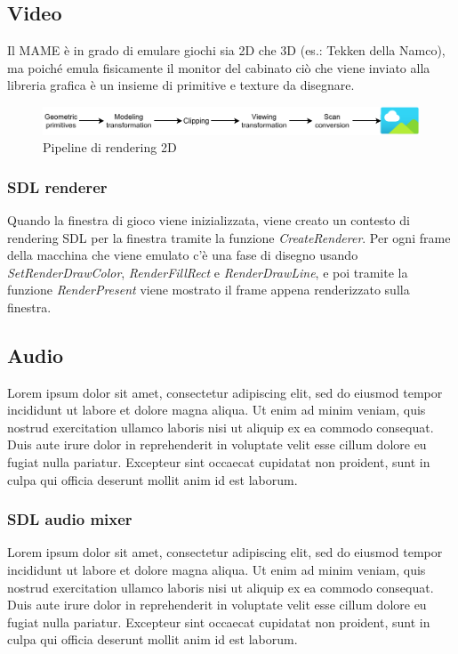 \subsection{Video}
Il MAME è in grado di emulare giochi sia 2D che 3D (es.: Tekken della Namco), ma poiché emula fisicamente il monitor del cabinato ciò che viene inviato alla libreria grafica è un insieme di primitive e texture da disegnare.

\begin{figure}[H]
	\includegraphics[width=\linewidth]{immagini/rendering_pipeline}
	\caption{Pipeline di rendering 2D}
	\label{fig:rendering_pipeline}
\end{figure}

\subsubsection{SDL renderer} \label{SDL_renderer}
Quando la finestra di gioco viene inizializzata, viene creato un contesto di rendering SDL per la finestra tramite la funzione \textit{CreateRenderer}. Per ogni frame della macchina che viene emulato c'è una fase di disegno usando \textit{SetRenderDrawColor}, \textit{RenderFillRect} e \textit{RenderDrawLine}, e poi tramite la funzione \textit{RenderPresent} viene mostrato il frame appena renderizzato sulla finestra.

\subsection{Audio}
Lorem ipsum dolor sit amet, consectetur adipiscing elit, sed do eiusmod tempor incididunt ut labore et dolore magna aliqua. Ut enim ad minim veniam, quis nostrud exercitation ullamco laboris nisi ut aliquip ex ea commodo consequat. Duis aute irure dolor in reprehenderit in voluptate velit esse cillum dolore eu fugiat nulla pariatur. Excepteur sint occaecat cupidatat non proident, sunt in culpa qui officia deserunt mollit anim id est laborum.

\subsubsection{SDL audio mixer}
Lorem ipsum dolor sit amet, consectetur adipiscing elit, sed do eiusmod tempor incididunt ut labore et dolore magna aliqua. Ut enim ad minim veniam, quis nostrud exercitation ullamco laboris nisi ut aliquip ex ea commodo consequat. Duis aute irure dolor in reprehenderit in voluptate velit esse cillum dolore eu fugiat nulla pariatur. Excepteur sint occaecat cupidatat non proident, sunt in culpa qui officia deserunt mollit anim id est laborum.

\cite{CPP_Primer}
\cite{Computer_Networking_and_the_Internet}
\cite{Ingegneria_del_software}
\cite{Understanding_the_Linux_Kernel}
\cite{Windows_Server_2012}